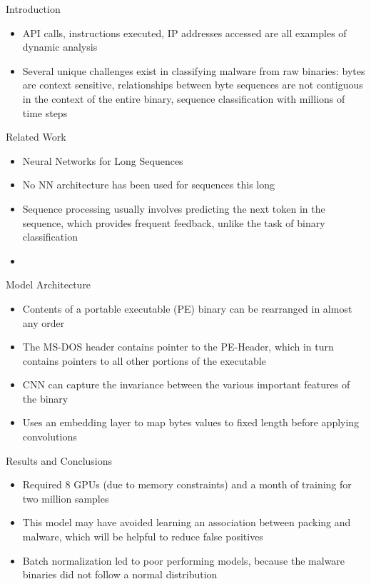 \documentclass{article}
\begin{document}
Introduction
\begin{itemize}
\item API calls, instructions executed, IP addresses accessed are all examples of dynamic analysis
\item Several unique challenges exist in classifying malware from raw binaries: bytes are context sensitive, relationships between byte sequences are not contiguous in the context of the entire binary, sequence classification with millions of time steps
\end{itemize}
Related Work
\begin{itemize}
\item Neural Networks for Long Sequences
\item No NN architecture has been used for sequences this long
\item Sequence processing usually involves predicting the next token in the sequence, which provides frequent feedback, unlike the task of binary classification
\item 
\end{itemize}
Model Architecture
\begin{itemize}
\item Contents of a portable executable (PE) binary can be rearranged in almost any order
\item The MS-DOS header contains pointer to the PE-Header, which in turn contains pointers to all other portions of the executable
\item CNN can capture the invariance between the various important features of the binary
\item Uses an embedding layer to map bytes values to fixed length before applying convolutions
\end{itemize}
Results and Conclusions
\begin{itemize}
\item Required 8 GPUs (due to memory constraints) and a month of training for two million samples
\item This model may have avoided learning an association between packing and malware, which will be helpful to reduce false positives
\item Batch normalization led to poor performing models, because the malware binaries did not follow a normal distribution
\end{itemize}

\pagebreak

\end{document}

